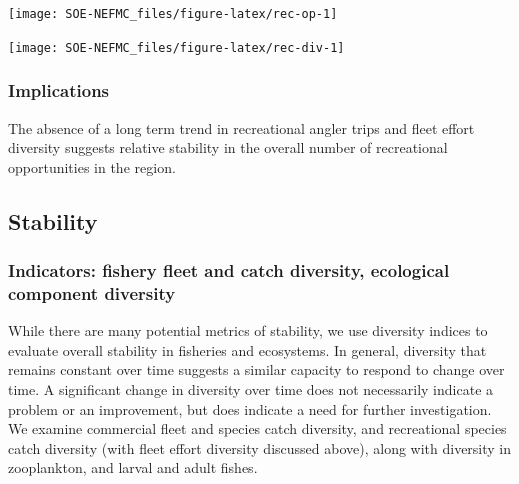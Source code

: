 \documentclass[
  10pt,
]{article}
\let\origfigure\figure
\let\endorigfigure\endfigure
\renewenvironment{figure}[1][2] {
    \expandafter\origfigure\expandafter[H]
} {
    \endorigfigure
}
\begin{document}
\begin{figure}

{\centering \texttt{[image: SOE-NEFMC\_files/figure-latex/rec-op-1]} 

}

\caption{Recreational effort in New England.}\label{fig:rec-op}
\end{figure}

\begin{figure}

{\centering \texttt{[image: SOE-NEFMC\_files/figure-latex/rec-div-1]} 

}

\caption{Recreational fleet effort diversity in New England.}\label{fig:rec-div}
\end{figure}

\hypertarget{implications-2}{%
\subsubsection{Implications}\label{implications-2}}

The absence of a long term trend in recreational angler trips and fleet effort diversity suggests relative stability in the overall number of recreational opportunities in the region.

\hypertarget{stability}{%
\subsection{Stability}\label{stability}}

\hypertarget{indicators-fishery-fleet-and-catch-diversity-ecological-component-diversity}{%
\subsubsection{Indicators: fishery fleet and catch diversity, ecological component diversity}\label{indicators-fishery-fleet-and-catch-diversity-ecological-component-diversity}}

While there are many potential metrics of stability, we use diversity indices to evaluate overall stability in fisheries and ecosystems. In general, diversity that remains constant over time suggests a similar capacity to respond to change over time. A significant change in diversity over time does not necessarily indicate a problem or an improvement, but does indicate a need for further investigation. We examine commercial fleet and species catch diversity, and recreational species catch diversity (with fleet effort diversity discussed above), along with diversity in zooplankton, and larval and adult fishes.
\end{document}
